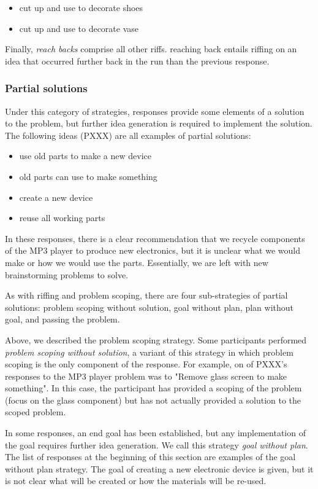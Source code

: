 \begin{itemize}
\item cut up and use to decorate shoes
\item cut up and use to decorate vase
\end{itemize}

Finally, \emph{reach backs} comprise all other riffs. reaching back entails riffing on an idea that occurred further back in the run than the previous response. 

\subsubsection{Partial solutions}

Under this category of strategies, responses provide some elements of a solution to the problem, but further idea generation is required to implement the solution. The following ideas (PXXX) are all examples of partial solutions:

\begin{itemize}
    \item use old parts to make a new device
    \item old parts can use to make something
    \item create a new device
    \item reuse all working parts
\end{itemize}

In these responses, there is a clear recommendation that we recycle components of the MP3 player to produce new electronics, but it is unclear what we would make or how we would use the parts. Essentially, we are left with new brainstorming problems to solve.

As with riffing and problem scoping, there are four sub-strategies of partial solutions: problem scoping without solution, goal without plan, plan without goal, and passing the problem. 

Above, we described the problem scoping strategy. Some participants performed \emph{problem scoping without solution}, a variant of this strategy in which problem scoping is the only component of the response.
For example, on of PXXX's responses to the MP3 player problem was to "Remove glass screen to make something". In this case, the participant has provided a scoping of the problem (focus on the glass component) but has not actually provided a solution to the scoped problem.

In some responses, an end goal has been established, but any implementation of the goal requires further idea generation. We call this strategy \emph{goal without plan}. The list of responses at the beginning of this section are examples of the goal without plan strategy.
The goal of creating a new electronic device is given, but it is not clear what will be created or how the materials will be re-used.

